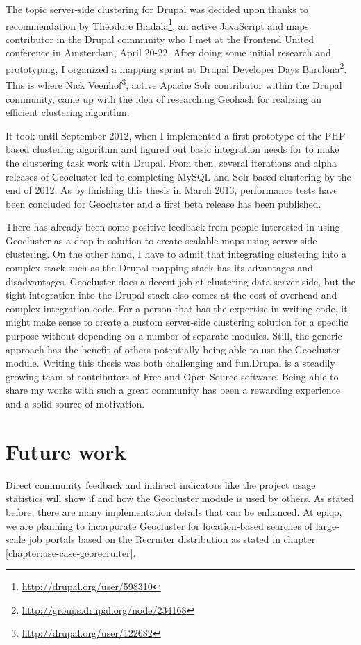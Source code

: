 The topic server-side clustering for Drupal was decided upon thanks to recommendation by Th\'eodore Biadala\footnote{\url{http://drupal.org/user/598310}}, an active JavaScript and maps contributor in the Drupal community who I met at the Frontend United conference in Amsterdam, April 20-22. After doing some initial research and prototyping, I organized a mapping sprint at Drupal Developer Days Barclona\footnote{\url{http://groups.drupal.org/node/234168}}. This is where Nick Veenhof\footnote{\url{http://drupal.org/user/122682}}, active Apache Solr contributor within the Drupal community, came up with the idea of researching Geohash for realizing an efficient clustering algorithm.

It took until September 2012, when I implemented a first prototype of the PHP-based clustering algorithm and figured out basic integration needs for to make the clustering task work with Drupal. From then, several iterations and alpha releases of Geocluster led to completing MySQL and Solr-based clustering by the end of 2012. As by finishing this thesis in March 2013, performance tests have been concluded for Geocluster and a first beta release has been published.

There has already been some positive feedback from people interested in using Geocluster as a drop-in solution to create scalable maps using server-side clustering. On the other hand, I have to admit that integrating clustering into a complex stack such as the Drupal mapping stack has its advantages and disadvantages. Geocluster does a decent job at clustering data server-side, but the tight integration into the Drupal stack also comes at the cost of overhead and complex integration code. For a person that has the expertise in writing code, it might make sense to create a custom server-side clustering solution for a specific purpose without depending on a number of separate modules. Still, the generic approach has the benefit of others potentially being able to use the Geocluster module. Writing this thesis was both challenging and fun.Drupal is a steadily growing team of contributors of Free and Open Source software. Being able to share my works with such a great community has been a rewarding experience and a solid source of motivation. 

\section{Future work}

Direct community feedback and indirect indicators like the project usage statistics will show if and how the Geocluster module is used by others. As stated before, there are many implementation details that can be enhanced. At epiqo, we are planning to incorporate Geocluster for location-based searches of large-scale job portals based on the Recruiter distribution as stated in chapter \ref{chapter:use-case-georecruiter}. 

